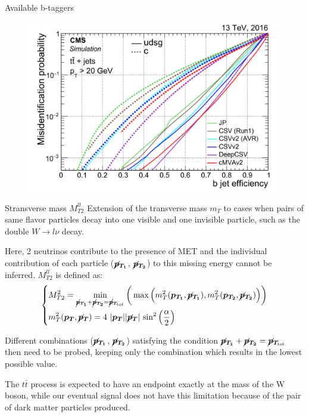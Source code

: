 \documentclass[8pt]{beamer}
\begin{document}
\begin{frame}{Available b-taggers}
\justifying
\begin{figure}[htbp]
\begin{center}
\includegraphics[width=11cm, height=7.5cm]{figs/CMSBTag.png}
\end{center}
\end{figure}
\end{frame}

\begin{frame}{Stransverse mass $M_{T2}^{ll}$}
\justifying
Extension of the transverse mass $m_T$ to cases when pairs of same flavor particles decay into one visible and one invisible particle, such as the double $W \rightarrow l\nu$ decay. \vfill

Here, 2 neutrinos contribute to the presence of MET and the individual contribution of each particle ($\bm{\cancel{p}_{T_{1}}}$, $\bm{\cancel{p}_{T_2}}$) to this missing energy cannot be inferred. $M_{T2}^{ll}$ is defined as:
\begin{equation*}
\begin{dcases}
M_{T2}^2 = \min_{\bm{\cancel{p}_{T_{1}}} + \bm{\cancel{p}_{T_{2}}} = \bm{\cancel{p}_{T_{\text{tot}}}}} \bigg (\max \Big (m_T^2(\bm{p_{T_1}}, \bm{\cancel{p}_{T_{1}}}), m_T^2(\bm{p_{T_2}}, \bm{\cancel{p}_{T_{2}}}) \Big ) \bigg ) \\
m_T^2(\bm{p_{T}}, \bm{\cancel{p}_{T}}) = 4 \text{ } |\bm{p_{T}}| |\bm{\cancel{p}_{T}}| \text{ sin}^2 \left (\frac{\alpha}{2} \right ) 
\end{dcases}
\end{equation*} \vfill

Different combinations ($\bm{\cancel{p}_{T_{1}}}$, $\bm{\cancel{p}_{T_{2}}}$) satisfying the condition $\bm{\cancel{p}_{T_{1}}} + \bm{\cancel{p}_{T_{2}}} = \bm{\cancel{p}_{T_{\text{tot}}}}$ then need to be probed, keeping only the combination which results in the lowest possible value. \vfill

The $t \bar t$ process is expected to have an endpoint exactly at the mass of the W boson, while our eventual signal does not have this limitation because of the pair of dark matter particles produced. \vfill
\end{frame}
\end{document}
